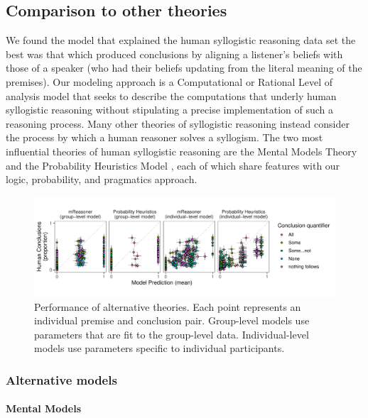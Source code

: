 \documentclass[floatsintext, doc]{apa6}
\begin{document}
\subsection{Comparison to other theories}

We found the model that explained the human syllogistic reasoning data set the best was that which produced conclusions by aligning a listener's beliefs with those of a speaker (who had their beliefs updating from the literal meaning of the premises).
Our modeling approach is a Computational or Rational Level of analysis model \cite{marr1982vision, anderson1990adaptive} that seeks to describe the computations that underly human syllogistic reasoning without stipulating a precise implementation of such a reasoning process. 
Many other theories of syllogistic reasoning instead consider the process by which a human reasoner solves a syllogism.
The two most influential theories of human syllogistic reasoning are the Mental Models Theory \cite{johnsonlaird2006we, khemlani2013processes} and the Probability Heuristics Model \cite{Chater1999}, each of which share features with our logic, probability, and pragmatics approach. 


\begin{figure}[t]
\centering
\includegraphics[width = \textwidth]{figs/alternative_model_scatters.pdf}
\caption{Performance of alternative theories. Each point represents an individual premise and conclusion pair. Group-level models use parameters that are fit to the group-level data. Individual-level models use parameters specific to individual participants. }
\label{fig:altModels}
\end{figure}

\subsubsection{Alternative models}

\paragraph{Mental Models}
\end{document}
